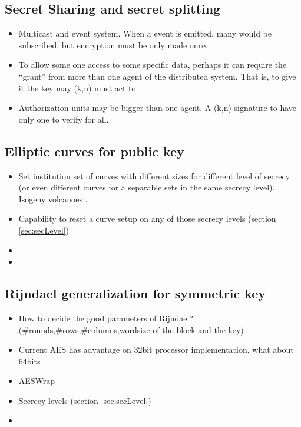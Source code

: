 \documentclass[10pt,a4paper,twoside]{llncs}
\begin{document}
%
\subsection{Secret Sharing and secret splitting \label{sec:secretSharing}}
\begin{itemize}
 \item Multicast and event system. When a event is emitted, many would be subscribed, but encryption must be only made once.
 \item To allow some one access to some specific data, perhaps it can require the ``grant'' from more than one agent of the distributed system. That is, to give it the key may (k,n) must act to.
 \item Authorization units may be bigger than one agent. A (k,n)-signature to have only one to verify for all.
\end{itemize}

%
\subsection{Elliptic curves for public key \label{sec:ecpk}}

\begin{itemize}
 \item Set institution set of curves with different sizes for different level of secrecy (or even different curves for a separable sets in the same secrecy level). Isogeny volcanoes \cite{secRickShareECs}.
 \item Capability to reset a curve setup on any of those secrecy levels (section \ref{sec:secLevel})
 \item 
 \item 
\end{itemize}

%
\subsection{Rijndael generalization for symmetric key \label{sec:gRijndael}}

\begin{itemize}
 \item How to decide the good parameters of Rijndael? (\#rounds,\#rows,\#columns,wordsize of the block and the key) \cite{gRijndael}
 \item Current AES has advantage on 32bit processor implementation, what about 64bits
 \item AESWrap \cite{rfc3394}
 \item Secrecy levels (section \ref{sec:secLevel})
 \item 
\end{itemize}
\end{document}
